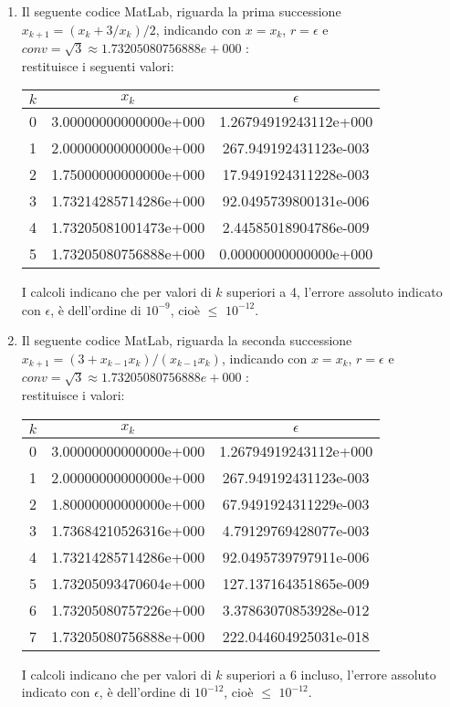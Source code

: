 \begin{enumerate}
	\item
		Il seguente codice MatLab, riguarda la prima successione $x_{k+1} = (x_k + 3/x_k)/2$, indicando con $x=x_k$, $r=\epsilon$ e $conv = \sqrt{3} \approx 1.73205080756888e+000$ :\\
		
		restituisce i seguenti valori:\\
		\begin{center}
			\begin{tabular}{|c|c|c|}
			\hline
				$k$ & $x_k$ & $\epsilon$ \\
			\hline
    			0 & 3.00000000000000e+000 & 1.26794919243112e+000\\
    			1 & 2.00000000000000e+000 & 267.949192431123e-003\\
    			2 & 1.75000000000000e+000 & 17.9491924311228e-003\\
    			3 & 1.73214285714286e+000 & 92.0495739800131e-006\\
    			4 & 1.73205081001473e+000 & 2.44585018904786e-009\\
    			5 & 1.73205080756888e+000 & 0.00000000000000e+000\\
			\hline
			\end{tabular}
		\end{center}
		I calcoli indicano che per valori di $k$ superiori a 4, l'errore assoluto indicato con $\epsilon$, è dell'ordine di \(10^{-9}\), cioè $\leq$ \(10^{-12}\).\\
	\item
		Il seguente codice MatLab, riguarda la seconda successione $x_{k+1} = (3+x_{k-1}x_k)/(x_{k-1}x_k)$, indicando con $x=x_k$, $r=\epsilon$ e $conv = \sqrt{3} \approx 1.73205080756888e+000$ :\\
		
		restituisce i valori:\\
		\begin{center}
			\begin{tabular}{|c|c|c|}
			\hline
				$k$ & $x_k$ & $\epsilon$ \\
			\hline
    			0 & 3.00000000000000e+000 & 1.26794919243112e+000\\
    			1 & 2.00000000000000e+000 & 267.949192431123e-003\\
    			2 & 1.80000000000000e+000 & 67.9491924311229e-003\\
    			3 & 1.73684210526316e+000 & 4.79129769428077e-003\\
    			4 & 1.73214285714286e+000 & 92.0495739797911e-006\\
    			5 & 1.73205093470604e+000 & 127.137164351865e-009\\
    			6 & 1.73205080757226e+000 & 3.37863070853928e-012\\
    			7 & 1.73205080756888e+000 & 222.044604925031e-018\\
			\hline
			\end{tabular}
		\end{center}
		I calcoli indicano che per valori di $k$ superiori a 6 incluso, l'errore assoluto indicato con $\epsilon$, è dell'ordine di \(10^{-12}\), cioè $\leq$ \(10^{-12}\).\\
\end{enumerate}